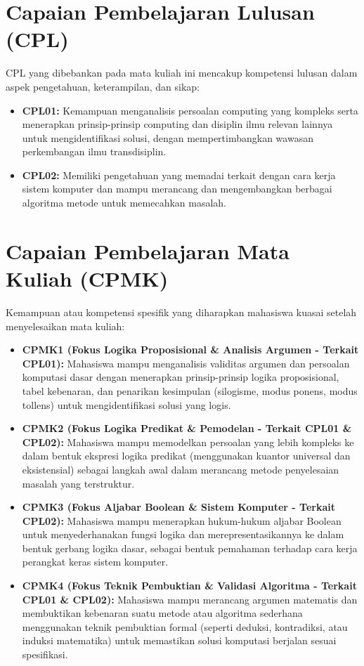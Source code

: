 \vspace{1cm}

\section*{Capaian Pembelajaran Lulusan (CPL)}

CPL yang dibebankan pada mata kuliah ini mencakup kompetensi lulusan dalam aspek pengetahuan, keterampilan, dan sikap:

\begin{itemize}
  \item \textbf{CPL01:} Kemampuan menganalisis persoalan computing yang kompleks serta menerapkan prinsip-prinsip computing dan disiplin ilmu relevan lainnya untuk mengidentifikasi solusi, dengan mempertimbangkan wawasan perkembangan ilmu transdisiplin.
  
  \item \textbf{CPL02:} Memiliki pengetahuan yang memadai terkait dengan cara kerja sistem komputer dan mampu merancang dan mengembangkan berbagai algoritma metode untuk memecahkan masalah.
\end{itemize}

\section*{Capaian Pembelajaran Mata Kuliah (CPMK)}

Kemampuan atau kompetensi spesifik yang diharapkan mahasiswa kuasai setelah menyelesaikan mata kuliah:

\begin{itemize}
  \item \textbf{CPMK1 (Fokus Logika Proposisional \& Analisis Argumen - Terkait CPL01):} Mahasiswa mampu menganalisis validitas argumen dan persoalan komputasi dasar dengan menerapkan prinsip-prinsip logika proposisional, tabel kebenaran, dan penarikan kesimpulan (silogisme, modus ponens, modus tollens) untuk mengidentifikasi solusi yang logis.
  
  \item \textbf{CPMK2 (Fokus Logika Predikat \& Pemodelan - Terkait CPL01 \& CPL02):} Mahasiswa mampu memodelkan persoalan yang lebih kompleks ke dalam bentuk ekspresi logika predikat (menggunakan kuantor universal dan eksistensial) sebagai langkah awal dalam merancang metode penyelesaian masalah yang terstruktur.
  
  \item \textbf{CPMK3 (Fokus Aljabar Boolean \& Sistem Komputer - Terkait CPL02):} Mahasiswa mampu menerapkan hukum-hukum aljabar Boolean untuk menyederhanakan fungsi logika dan merepresentasikannya ke dalam bentuk gerbang logika dasar, sebagai bentuk pemahaman terhadap cara kerja perangkat keras sistem komputer.
  
  \item \textbf{CPMK4 (Fokus Teknik Pembuktian \& Validasi Algoritma - Terkait CPL01 \& CPL02):} Mahasiswa mampu merancang argumen matematis dan membuktikan kebenaran suatu metode atau algoritma sederhana menggunakan teknik pembuktian formal (seperti deduksi, kontradiksi, atau induksi matematika) untuk memastikan solusi komputasi berjalan sesuai spesifikasi.
\end{itemize}


